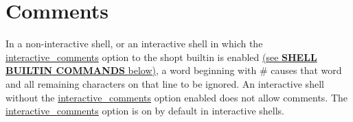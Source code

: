 \section{Comments}\label{sec:comments}
In a non-interactive shell, or an interactive shell in which the \url{interactive_comments} option to the shopt builtin is enabled \hyperref[sec:shellbuiltincommands]{(see \textbf{SHELL BUILTIN COMMANDS} below)}, a word beginning with \# causes that word and all remaining characters on that line to be ignored. An interactive shell without the \url{interactive_comments} option enabled does not allow comments. The \url{interactive_comments} option is on by default in interactive shells.